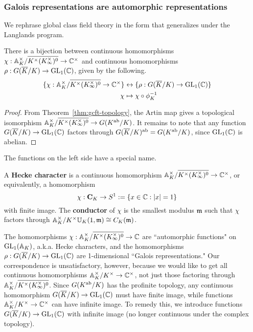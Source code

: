 \subsubsection{Galois representations are automorphic representations}
We rephrase global class field theory in the form that generalizes under the Langlands program.
\begin{thm}
There is a bijection between continuous homomorphisms $\chi:\mathbb{A}_K^{\times}/\overline{K^{\times}(K^{\times}_{\infty})^0}\to \mathbb{C}^{\times}$ and continuous homomorphisms $\rho:G(\overline{K}/K)\to \operatorname{GL}_1(\mathbb{C})$, given by the following.
\begin{align*}
\{
\chi:\mathbb{A}_K^{\times}/\overline{K^{\times}(K^{\times}_{\infty})^0}\to \mathbb{C}^{\times}
\}
&\leftrightarrow
\{\rho:G(\overline{K}/K)\to \operatorname{GL}_1(\mathbb{C})\} \\
\chi&\mapsto \chi\circ \phi_K^{-1}
\end{align*}
\end{thm}
\begin{proof}
From Theorem~\ref{thm:gcft-topology}, the Artin map gives a topological isomorphism $ \mathbb{A}_K^{\times}/\overline{K^{\times}(K^{\times}_{\infty})^0}\to G(K^{\text{ab}}/K)$. It remains to note that any function $G(\overline{K}/K)\to \operatorname{GL}_1(\mathbb{C})$ factors through $G(\overline{K}/K)^{\text{ab}}=G(K^{\text{ab}}/K)$, since $\operatorname{GL}_1(\mathbb{C})$ is abelian.
\end{proof}
The functions on the left side have a special name.
\begin{df}
A \textbf{Hecke character} is a continuous homomorphism $\mathbb{A}_K^{\times}/\overline{K^{\times}(K^{\times}_{\infty})^0}\to \mathbb{C}^{\times}$, or equivalently, a homomorphism
\[\chi:\mathbf C_K\to S^1:=\left\{{x\in \mathbb{C}}:{|x|=1}\right\}\]
with finite image.  
The \textbf{conductor} of $\chi$ is the smallest modulus $\mathfrak{m}$ such that $\chi$ factors through $\mathbb{A}_K^{\times}/K^{\times}\mathbb U_K(1,\mathfrak{m})\cong C_K(\mathfrak{m})$. 
\end{df}

The homomorphisms $\chi:\mathbb{A}_K^{\times}/\overline{K^{\times}(K^{\times}_{\infty})^0}\to \mathbb{C}$ are ``automorphic functions" on $\operatorname{GL}_1(\mathbb{A}_K)$, a.k.a. Hecke characters, and the homomorphisms $\rho:G(\overline{K}/K)\to \operatorname{GL}_1(\mathbb{C})$ are 1-dimensional ``Galois representations." Our correspondence is unsatisfactory, however, because we would like to get all continuous homomorphisms $\mathbb{A}_K^{\times}/K^{\times}\to \mathbb{C}^{\times}$, not just those factoring through $\mathbb{A}_K^{\times}/\overline{K^{\times}(K^{\times}_{\infty})^0}$. Since $G(K^{\text{ab}}/K)$ has the profinite topology, %
any continuous homomorphism $G(\overline{K}/K)\to \operatorname{GL}_1(\mathbb{C})$ must have finite image, while functions $\mathbb{A}_K^{\times}/K^{\times}\to \mathbb{C}^{\times}$ can have infinite image. To remedy this, we introduce functions $G(\overline{K}/K)\to \operatorname{GL}_1(\mathbb{C})$ with infinite image (no longer continuous under the complex topology).

